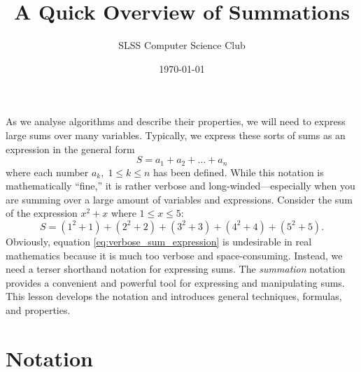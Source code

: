 \documentclass[prereq]{cslesson}
\title{A Quick Overview of Summations}
\author{SLSS Computer Science Club}
\date{\today}
\begin{document}
    
\maketitle

As we analyse algorithms and describe their properties, we will need to express large sums over many variables. Typically, we express these sorts of sums as an 
expression in the general form
\begin{equation*}
    S=a_1+a_2+\ldots+a_n
    \label{eq:verbose_sum}
\end{equation*}
where each number $a_k,\;1 \leq k \leq n$ has been defined. While this notation is mathematically ``fine,'' it is rather verbose and long-winded---especially 
when you are summing over a large amount of variables and expressions. Consider the sum of the expression $x^2+x$ where $1 \leq x \leq 5$:
\begin{equation}
    S=(1^2+1)+(2^2+2)+(3^2+3)+(4^2+4)+(5^2+5).
    \label{eq:verbose_sum_expression}
\end{equation}
Obviously, equation \ref{eq:verbose_sum_expression} is undesirable in real mathematics because it is much too verbose and space-consuming.
Instead, we need a terser shorthand notation for expressing sums. The \textit{summation} notation provides a convenient and powerful tool for 
expressing and manipulating sums. This lesson develops the notation and introduces general techniques, formulas, and properties.

\section{Notation}
\end{document}
